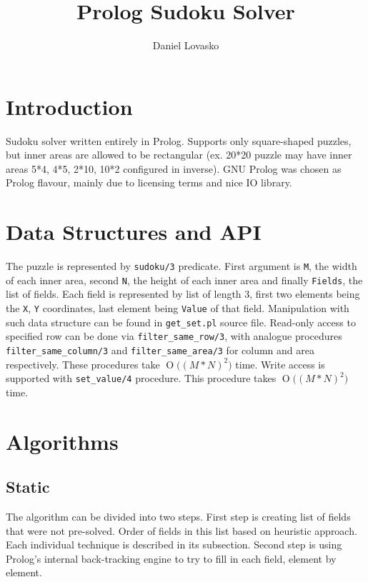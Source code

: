 \documentclass{article}
\newcommand{\BigO}[1]{\ensuremath{\operatorname{O}\bigl(#1\bigr)}}
\begin{document}
	\title{Prolog Sudoku Solver}
	\author{Daniel Lovasko}
	\date{}
	\maketitle
	
	\section*{Introduction}
	Sudoku solver written entirely in Prolog. Supports only square-shaped puzzles, but inner areas are allowed to be rectangular (ex. 20*20 puzzle may have inner areas 5*4, 4*5, 2*10, 10*2 configured in inverse).
	\newline
	\indent GNU Prolog was chosen as Prolog flavour, mainly due to licensing terms and nice IO library.

	\section{Data Structures and API}
	The puzzle is represented by {\tt sudoku/3} predicate. First argument is {\tt M}, the width of each inner area, second {\tt N}, the height of each inner area and finally {\tt Fields}, the list of fields.
	Each field is represented by list of length 3, first two elements being the {\tt X}, {\tt Y} coordinates, last element being {\tt Value} of that field.
	\newline
	\newline
	\indent	Manipulation with such data structure can be found in {\tt get\_set.pl} source file.
	Read-only access to specified row can be done via {\tt filter\_same\_row/3}, with analogue procedures {\tt filter\_same\_column/3} and {\tt filter\_same\_area/3} for column and area respectively. These procedures take \BigO{(M*N)^2} time.
	\newline
	\newline
	\indent	Write access is supported with {\tt set\_value/4} procedure. This procedure takes \BigO{(M*N)^2} time.

	\section{Algorithms}
	\subsection{Static}
	The algorithm can be divided into two steps. First step is creating list of fields that were not pre-solved. Order of fields in this list based on heuristic approach. Each individual technique is described in its subsection.
	\newline Second step is using Prolog's internal back-tracking engine to try to fill in each field, element by element.
\end{document}
